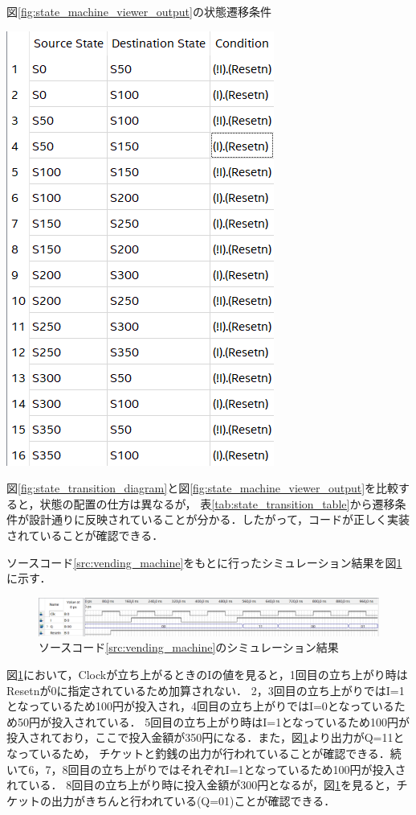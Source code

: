 \documentclass{jlreq}
\numberwithin{equation}{section}
\begin{document}
\begin{table}[H]
	\centering
	\caption{図\ref{fig:state_machine_viewer_output}の状態遷移条件}
	\includegraphics{assets/state_transition_table.png}
	\label{tab:state_transition_table}
\end{table}

図\ref{fig:state_transition_diagram}と図\ref{fig:state_machine_viewer_output}を比較すると，状態の配置の仕方は異なるが，
表\ref{tab:state_transition_table}から遷移条件が設計通りに反映されていることが分かる．したがって，コードが正しく実装されていることが確認できる．

ソースコード\ref{src:vending_machine}をもとに行ったシミュレーション結果を図\ref{fig:vending_machine_sim}に示す．
\begin{figure}[H]
	\centering
	\includegraphics[width=\textwidth]{assets/vending_machine_sim.png}
	\caption{ソースコード\ref{src:vending_machine}のシミュレーション結果}
	\label{fig:vending_machine_sim}
\end{figure}

図\ref{fig:vending_machine_sim}において，Clockが立ち上がるときのIの値を見ると，1回目の立ち上がり時はResetnが0に指定されているため加算されない．
2，3回目の立ち上がりではI=1となっているため100円が投入され，4回目の立ち上がりではI=0となっているため50円が投入されている．
5回目の立ち上がり時はI=1となっているため100円が投入されており，ここで投入金額が350円になる．また，図\ref{fig:vending_machine_sim}より出力がQ=11となっているため，
チケットと釣銭の出力が行われていることが確認できる．続いて6，7，8回目の立ち上がりではそれぞれI=1となっているため100円が投入されている．
8回目の立ち上がり時に投入金額が300円となるが，図\ref{fig:vending_machine_sim}を見ると，チケットの出力がきちんと行われている(Q=01)ことが確認できる．
\end{document}
